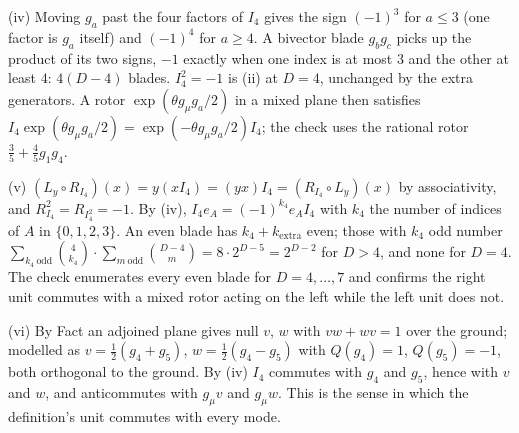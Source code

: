 (iv) Moving $g_a$ past the four factors of $I_4$ gives the sign $(-1)^{3}$ for $a \le 3$ (one factor is $g_a$ itself) and $(-1)^{4}$ for $a \ge 4$. A bivector blade $g_bg_c$ picks up the product of its two signs, $-1$ exactly when one index is at most $3$ and the other at least $4$: $4(D-4)$ blades. $I_4^2 = -1$ is (ii) at $D = 4$, unchanged by the extra generators. A rotor $\exp(\theta g_{\mu}g_a/2)$ in a mixed plane then satisfies $I_4\exp(\theta g_{\mu}g_a/2) = \exp(-\theta g_{\mu}g_a/2)I_4$; the check uses the rational rotor $\tfrac35 + \tfrac45 g_1g_4$.

(v) $(L_y \circ R_{I_4})(x) = y(xI_4) = (yx)I_4 = (R_{I_4} \circ L_y)(x)$ by associativity, and $R_{I_4}^2 = R_{I_4^2} = -1$. By (iv), $I_4e_A = (-1)^{k_4}e_AI_4$ with $k_4$ the number of indices of $A$ in $\{0, 1, 2, 3\}$. An even blade has $k_4 + k_{\mathrm{extra}}$ even; those with $k_4$ odd number $\sum_{k_4\ \mathrm{odd}}\binom{4}{k_4}\cdot\sum_{m\ \mathrm{odd}}\binom{D-4}{m} = 8\cdot 2^{D-5} = 2^{D-2}$ for $D > 4$, and none for $D = 4$. The check enumerates every even blade for $D = 4, \ldots, 7$ and confirms the right unit commutes with a mixed rotor acting on the left while the left unit does not.

(vi) By Fact  an adjoined plane gives null $v$, $w$ with $vw + wv = 1$ over the ground; modelled as $v = \tfrac12(g_4 + g_5)$, $w = \tfrac12(g_4 - g_5)$ with $Q(g_4) = 1$, $Q(g_5) = -1$, both orthogonal to the ground. By (iv) $I_4$ commutes with $g_4$ and $g_5$, hence with $v$ and $w$, and anticommutes with $g_{\mu}v$ and $g_{\mu}w$. This is the sense in which the definition's unit commutes with every mode.

